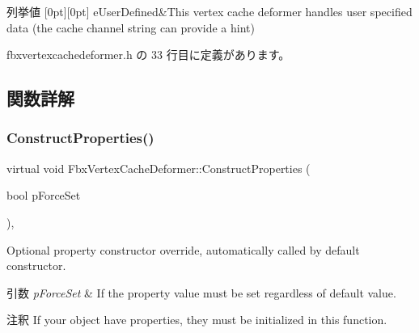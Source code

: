 \begin{DoxyEnumFields}{列挙値}
[0pt][0pt]{}\mbox{\label{class_fbx_vertex_cache_deformer_a24f0c46d4f47717615852a8e7346efedafdf33d4ddb69c7cc595986665c3eab27}} 
e\+User\+Defined&This vertex cache deformer handles user specified data (the cache channel string can provide a hint) \\
\hline

\end{DoxyEnumFields}


 fbxvertexcachedeformer.\+h の 33 行目に定義があります。



\subsection{関数詳解}
\mbox{\label{class_fbx_vertex_cache_deformer_aed14ffc10416f556b602b87e8d8d6926}} 
\subsubsection{\texorpdfstring{Construct\+Properties()}{ConstructProperties()}}
{\footnotesize\ttfamily virtual void Fbx\+Vertex\+Cache\+Deformer\+::\+Construct\+Properties (\begin{DoxyParamCaption}\item[{bool}]{p\+Force\+Set }\end{DoxyParamCaption})\hspace{0.3cm}{\ttfamily [protected]}, {\ttfamily [virtual]}}

Optional property constructor override, automatically called by default constructor. 
\begin{DoxyParams}{引数}
{\em p\+Force\+Set} & If the property value must be set regardless of default value. \\
\hline
\end{DoxyParams}
\begin{DoxyRemark}{注釈}
If your object have properties, they must be initialized in this function. 
\end{DoxyRemark}


